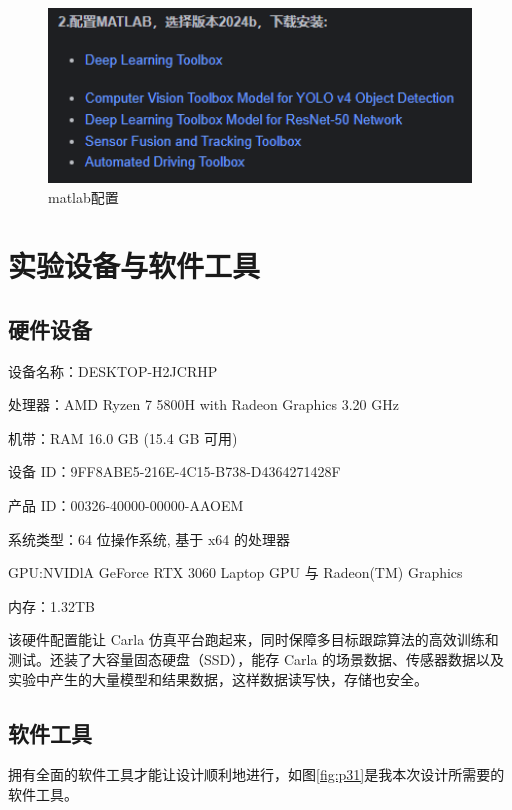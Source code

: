 \begin{figure}[htbp] %
	\centering
	\includegraphics[width=1\textwidth]{p8} %
	\caption{matlab配置} %
	\label{fig:p8} %
\end{figure}






\section{实验设备与软件工具}

\subsection{硬件设备}

设备名称：DESKTOP-H2JCRHP

处理器：AMD Ryzen 7 5800H with Radeon Graphics            3.20 GHz

机带：RAM	16.0 GB (15.4 GB 可用)

设备 ID：9FF8ABE5-216E-4C15-B738-D4364271428F

产品 ID：00326-40000-00000-AAOEM

系统类型：64 位操作系统, 基于 x64 的处理器

GPU:NVIDlA GeForce RTX 3060 Laptop GPU 与 Radeon(TM) Graphics

内存：1.32TB

该硬件配置能让 Carla 仿真平台跑起来，同时保障多目标跟踪算法的高效训练和测试。还装了大容量固态硬盘（SSD），能存 Carla 的场景数据、传感器数据以及实验中产生的大量模型和结果数据，这样数据读写快，存储也安全。


\subsection{软件工具}

拥有全面的软件工具才能让设计顺利地进行，如图\ref{fig:p31}是我本次设计所需要的软件工具。


